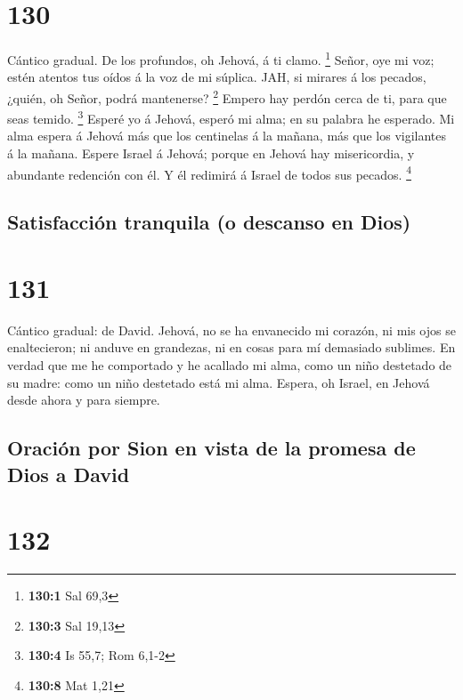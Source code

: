 \hypertarget{section-129}{%
\section{130}\label{section-129}}

 Cántico gradual. De los profundos, oh Jehová, á ti clamo.
\footnote{\textbf{130:1} Sal 69,3}  Señor, oye mi voz; estén
atentos tus oídos á la voz de mi súplica.  JAH, si mirares á
los pecados, ¿quién, oh Señor, podrá mantenerse? \footnote{\textbf{130:3}
  Sal 19,13}  Empero hay perdón cerca de ti, para que seas
temido. \footnote{\textbf{130:4} Is 55,7; Rom 6,1-2}  Esperé
yo á Jehová, esperó mi alma; en su palabra he esperado.  Mi
alma espera á Jehová más que los centinelas á la mañana, más que los
vigilantes á la mañana.  Espere Israel á Jehová; porque en
Jehová hay misericordia, y abundante redención con él.  Y él
redimirá á Israel de todos sus pecados. \footnote{\textbf{130:8} Mat
  1,21}

\hypertarget{satisfacciuxf3n-tranquila-o-descanso-en-dios}{%
\subsection{Satisfacción tranquila (o descanso en
Dios)}\label{satisfacciuxf3n-tranquila-o-descanso-en-dios}}

\hypertarget{section-130}{%
\section{131}\label{section-130}}

 Cántico gradual: de David. Jehová, no se ha envanecido mi
corazón, ni mis ojos se enaltecieron; ni anduve en grandezas, ni en
cosas para mí demasiado sublimes.  En verdad que me he
comportado y he acallado mi alma, como un niño destetado de su madre:
como un niño destetado está mi alma.  Espera, oh Israel, en
Jehová desde ahora y para siempre.

\hypertarget{oraciuxf3n-por-sion-en-vista-de-la-promesa-de-dios-a-david}{%
\subsection{Oración por Sion en vista de la promesa de Dios a
David}\label{oraciuxf3n-por-sion-en-vista-de-la-promesa-de-dios-a-david}}

\hypertarget{section-131}{%
\section{132}\label{section-131}}

